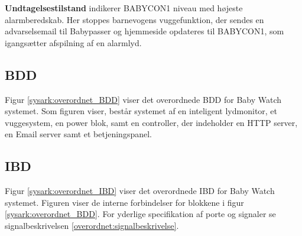 \textbf{Undtagelsestilstand} indikerer BABYCON1 niveau med højeste alarmberedskab. Her stoppes barnevogens vuggefunktion, der sendes en advarselsemail til Babypasser og hjemmeside opdateres til BABYCON1, som igangsætter afspilning af en alarmlyd. 


\subsection{BDD}
Figur \ref{sysark:overordnet_BDD} viser det overordnede BDD for Baby Watch systemet. Som figuren viser, består systemet af en inteligent lydmonitor, et vuggesystem, en power blok, samt en controller, der indeholder en HTTP server, en Email server samt et betjeningspanel.


\subsection{IBD}

Figur \ref{sysark:overordnet_IBD} viser det overordnede IBD for Baby Watch systemet.  Figuren viser de interne forbindelser for blokkene i figur \ref{sysark:overordnet_BDD}. For yderlige specifikation af porte og signaler se signalbeskrivelsen \ref{overordnet:signalbeskrivelse}.




